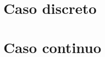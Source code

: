 \documentclass[11pt]{report}
\theoremstyle{break}
\theoremstyle{break}
\begin{document}
\section{Caso discreto}
\label{seccion:variables discretas}

\section{Caso continuo}
\label{seccion:variables continuas}
\end{document}
